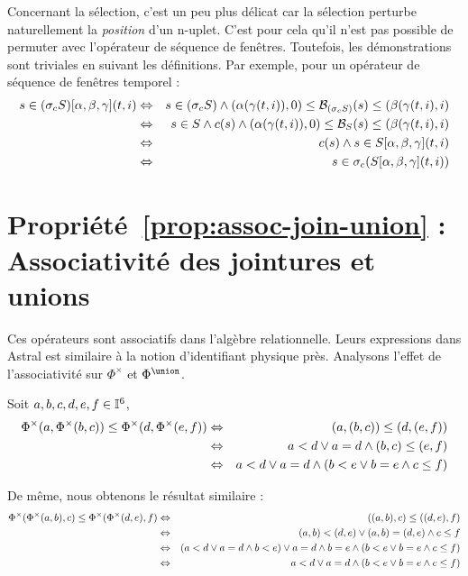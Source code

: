 Concernant la sélection, c'est un peu plus délicat car la sélection perturbe naturellement la \textit{position} d'un n-uplet. C'est pour cela qu'il n'est pas possible de permuter avec l'opérateur de séquence de fenêtres. Toutefois, les démonstrations sont triviales en suivant les définitions. Par exemple, pour un opérateur de séquence de fenêtres temporel :
\begin{eqnarray*}
s\in (\sigma_c S)[\alpha,\beta,\gamma](t,i) & \Leftrightarrow & s\in (\sigma_c S) \wedge (\alpha(\gamma(t,i)),0) \leq \mathcal{B}_{(\sigma_c S)}(s) \leq (\beta(\gamma(t,i),i)\\
& \Leftrightarrow & s\in S \wedge c(s) \wedge (\alpha(\gamma(t,i)),0) \leq \mathcal{B}_S(s) \leq (\beta(\gamma(t,i),i)\\
& \Leftrightarrow & c(s) \wedge s\in S[\alpha,\beta,\gamma](t,i)\\
& \Leftrightarrow & s\in \sigma_c (S[\alpha,\beta,\gamma](t,i))
\end{eqnarray*}
\findemo

\section{Propriété~\ref{prop:assoc-join-union} : Associativité des jointures et unions}
Ces opérateurs sont associatifs dans l'algèbre relationnelle. Leurs expressions dans Astral est similaire à la notion d'identifiant physique près. Analysons l'effet de l'associativité sur $\Phi^\times$ et $\Phi^\union$.

Soit $a,b,c,d,e,f \in \mathbb{I}^6$, 
\begin{eqnarray*}
\Phi^\times(a,\Phi^\times(b,c)) \leq \Phi^\times(d,\Phi^\times(e,f))& \Leftrightarrow & (a,(b,c)) \leq (d,(e,f)) \\
& \Leftrightarrow &  a < d \vee a=d \wedge (b,c) \leq (e,f) \\
& \Leftrightarrow &  a < d \vee a=d \wedge (b < e \vee b=e \wedge c \leq f)
\end{eqnarray*}

De même, nous obtenons le résultat similaire :
\begin{eqnarray*}
\Phi^\times(\Phi^\times(a,b),c) \leq \Phi^\times(\Phi^\times(d,e),f)& \Leftrightarrow & ((a,b),c) \leq ((d,e),f) \\
& \Leftrightarrow & (a,b) < (d,e) \vee (a,b) = (d,e) \wedge c \leq f \\
& \Leftrightarrow & (a < d \vee a = d \wedge b < e) \vee a = d \wedge b = e \wedge (b < e \vee b=e \wedge c \leq f) \\
& \Leftrightarrow &  a < d \vee a=d \wedge (b < e \vee b=e \wedge c \leq f)
\end{eqnarray*}

